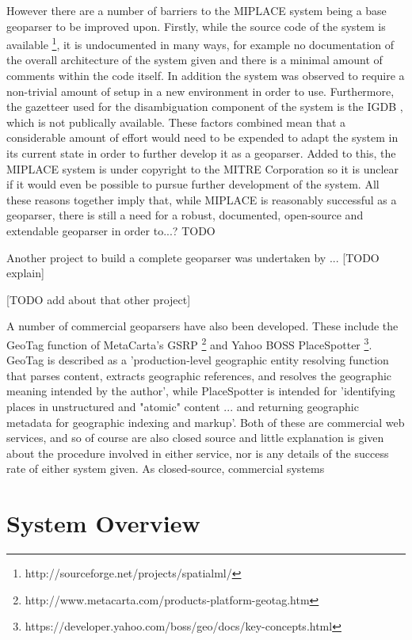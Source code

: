 \documentclass[12pt, a4paper]{report}
\begin{document}
However there are a number of barriers to the MIPLACE system being a base geoparser to be improved upon. Firstly, while the source code of the system is available \footnote{http://sourceforge.net/projects/spatialml/}, it is undocumented in many ways, for example no documentation of the overall architecture of the system given and there is a minimal amount of comments within the code itself. In addition the system was observed to require a non-trivial amount of setup in a new environment in order to use. Furthermore, the gazetteer used for the disambiguation component of the system is the IGDB \citep{igdb2005}, which is not publically available. These factors combined mean that a considerable amount of effort would need to be expended to adapt the system in its current state in order to further develop it as a geoparser. Added to this, the MIPLACE system is under copyright to the MITRE Corporation so it is unclear if it would even be possible to pursue further development of the system. All these reasons together imply that, while MIPLACE is reasonably successful as a geoparser, there is still a need for a robust, documented, open-source and extendable geoparser in order to...? TODO

Another project to build a complete geoparser was undertaken by \citet{tobin2010}... [TODO explain]

[TODO add about that other project]

A number of commercial geoparsers have also been developed. These include the GeoTag function of MetaCarta's GSRP \footnote{http://www.metacarta.com/products-platform-geotag.htm} and Yahoo BOSS PlaceSpotter \footnote{https://developer.yahoo.com/boss/geo/docs/key-concepts.html}. GeoTag is described as a 'production-level geographic entity resolving function that parses content, extracts geographic references, and resolves the geographic meaning intended by the author', while PlaceSpotter is intended for 'identifying places in unstructured and "atomic" content ... and returning geographic metadata for geographic indexing and markup'. Both of these are commercial web services, and so of course are also closed source and little explanation is given about the procedure involved in either service, nor is any details of the success rate of either system given. As closed-source, commercial systems 
 


\chapter{System Overview}
\end{document}

